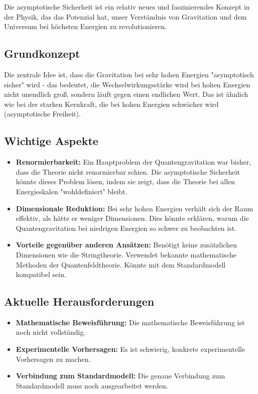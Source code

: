 \documentclass{article}
\begin{document}
Die asymptotische Sicherheit ist ein relativ neues und faszinierendes Konzept in der Physik, das das Potenzial hat, unser Verständnis von Gravitation und dem Universum bei höchsten Energien zu revolutionieren.

\subsection{Grundkonzept}

Die zentrale Idee ist, dass die Gravitation bei sehr hohen Energien "asymptotisch sicher" wird - das bedeutet, die Wechselwirkungsstärke wird bei hohen Energien nicht unendlich groß, sondern läuft gegen einen endlichen Wert. Das ist ähnlich wie bei der starken Kernkraft, die bei hohen Energien schwächer wird (asymptotische Freiheit).

\subsection{Wichtige Aspekte}

\begin{itemize}
	\item \textbf{Renormierbarkeit:} Ein Hauptproblem der Quantengravitation war bisher, dass die Theorie nicht renormierbar schien. Die asymptotische Sicherheit könnte dieses Problem lösen, indem sie zeigt, dass die Theorie bei allen Energieskalen "wohldefiniert" bleibt.
	\item \textbf{Dimensionale Reduktion:} Bei sehr hohen Energien verhält sich der Raum effektiv, als hätte er weniger Dimensionen. Dies könnte erklären, warum die Quantengravitation bei niedrigen Energien so schwer zu beobachten ist.
	\item \textbf{Vorteile gegenüber anderen Ansätzen:} Benötigt keine zusätzlichen Dimensionen wie die Stringtheorie. Verwendet bekannte mathematische Methoden der Quantenfeldtheorie. Könnte mit dem Standardmodell kompatibel sein.
\end{itemize}

\subsection{Aktuelle Herausforderungen}

\begin{itemize}
	\item \textbf{Mathematische Beweisführung:} Die mathematische Beweisführung ist noch nicht vollständig.
	\item \textbf{Experimentelle Vorhersagen:} Es ist schwierig, konkrete experimentelle Vorhersagen zu machen.
	\item \textbf{Verbindung zum Standardmodell:} Die genaue Verbindung zum Standardmodell muss noch ausgearbeitet werden.
\end{itemize}
\end{document}
